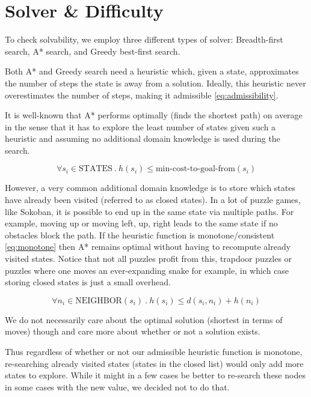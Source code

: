 \section{Solver \& Difficulty}
To check solvability, we employ three different types of solver: Breadth-first search, A* search, and Greedy best-first search.

Both A* and Greedy search need a heuristic which, given a state, approximates the number of steps the state is away from a solution. Ideally, this heuristic never overestimates the number of steps, making it admissible \ref{eq:admissibility}.

It is well-known that A* performs optimally (finds the shortest path) on average in the sense that it has to explore the least number of states given such a heuristic and assuming no additional domain knowledge is used during the search.

\begin{equation}
\label{eq:admissibility}
\forall s_i \in \text{STATES} \: . \: h(s_i) \leq \text{min-cost-to-goal-from}(s_i)
\end{equation}
    
However, a very common additional domain knowledge is to store which states have already been visited (referred to as closed states). In a lot of puzzle games, like Sokoban, it is possible to end up in the same state via multiple paths. For example, moving up or moving left, up, right leads to the same state if no obstacles block the path. If the heuristic function is monotone/consistent \ref{eq:monotone} then A* remains optimal without having to recompute already visited states. Notice that not all puzzles profit from this, trapdoor puzzles or puzzles where one moves an ever-expanding snake for example, in which case storing closed states is just a small overhead. 
    
\begin{equation}
\label{eq:monotone}
\forall n_i \in \text{NEIGHBOR}(s_i) \: . \: h(s_i) \leq d(s_i, n_i) + h(n_i)
\end{equation}

We do not necessarily care about the optimal solution (shortest in terms of moves) though and care more about whether or not a solution exists. 

Thus regardless of whether or not our admissible heuristic function is monotone, re-searching already visited states (states in the closed list) would only add more states to explore. While it might in a few cases be better to re-search these nodes in some cases with the new value, we decided not to do that.

